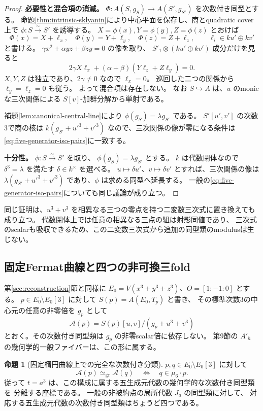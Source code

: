 \documentclass[a4paper,11pt]{ltjsarticle}
\theoremstyle{definition}
\newtheorem{theorem}{命題}[section]
\begin{document}
\begin{proof}
\textbf{必要性と混合項の消滅。}
$\Phi:A(S,g_S)\to A(S',g_{S'})$ を次数付き同型とする。
命題\ref{thm:intrinsic-sklyanin}により中心平面を保存し、商とquadratic cover上で
$\phi:S\xrightarrow{\sim}S'$ を誘導する。
$X=\phi(x),Y=\phi(y),Z=\phi(z)$ とおけば
\[
 \Phi(x)=X+\ell_x,\quad \Phi(y)=Y+\ell_y,\quad
 \Phi(z)=Z+\ell_z,\qquad \ell_i\in ku'\oplus kv'
\]
と書ける。
$\gamma x^2+\alpha yz+\beta zy=0$ の像を取り、
$S'_1\otimes(ku'\oplus kv')$ 成分だけを見ると
\[
 2\gamma X\ell_x+(\alpha+\beta)(Y\ell_z+Z\ell_y)=0.
\]
$X,Y,Z$ は独立であり、$2\gamma\ne0$ なので $\ell_x=0$。
巡回した二つの関係から $\ell_y=\ell_z=0$ も従う。
よって混合項は存在しない。
なお $S\hookrightarrow A$ は、$u$ のmonicな三次関係による
$S[v]$-加群分解から単射である。

補題\ref{lem:canonical-central-line}により $\phi(g_S)=\lambda g_{S'}$ である。
$S'[u',v']$ の次数3で商の核は
$k(g_{S'}+u'^3+v'^3)$ なので、三次関係の像が零になる条件は
\eqref{eq:five-generator-iso-pairs}に一致する。

\textbf{十分性。}
$\phi:S\xrightarrow{\sim}S'$ を取り、
$\phi(g_S)=\lambda g_{S'}$ とする。
$k$ は代数閉体なので $\delta^3=\lambda$ を満たす $\delta\in k^\times$ を選べる。
$u\mapsto\delta u'$、$v\mapsto\delta v'$ とすれば、三次関係の像は
$\lambda(g_{S'}+u'^3+v'^3)$ であり、$\phi$ は求める同型へ延長する。
一般の\eqref{eq:five-generator-iso-pairs}についても同じ議論が成り立つ。
\end{proof}

同じ証明は、$u^3+v^3$ を相異なる三つの零点を持つ二変数三次式に置き換えても成り立つ。
代数閉体上では任意の相異なる三点の組は射影同値であり、
三次式のscalarも吸収できるため、この二変数三次式から追加の同型類のmodulusは生じない。

\subsection{固定Fermat曲線と四つの非可換三fold}

第\ref{sec:reconstruction}節と同様に
$E_0=V(x^3+y^3+z^3)$、$O=[1:-1:0]$ とする。
$p\in E_0\setminus E_0[3]$ に対して $S(p)=A(E_0,T_p)$ と書き、
その標準次数3の中心元の任意の非零倍を $g_p$ として
\[
 \mathcal A(p)=S(p)[u,v]/(g_p+u^3+v^3)
\]
とおく。その次数付き同型類は $g_p$ の非零scalar倍に依存しない。
第9節の $A'_h$ の幾何学的一般ファイバーは、この形に属する。

\begin{theorem}[固定楕円曲線上での完全な次数付き分類]\label{thm:four-five-generator}
$p,q\in E_0\setminus E_0[3]$ に対して
\[
 \mathcal A(p)\simeq_{\mathrm{gr}}\mathcal A(q)
 \quad\Longleftrightarrow\quad q\in\mu_6\cdot p.
\]
従って $t=a^3$ は、この構成に属する五生成元代数の幾何学的な次数付き同型類を
分離する座標である。
一般の非被約点の局所代数 $J_a$ の同型類に対して、
対応する五生成元代数の次数付き同型類はちょうど四つである。
\end{theorem}
\end{document}
